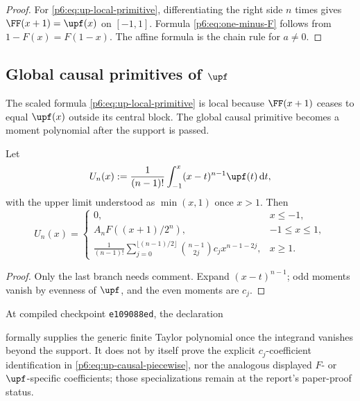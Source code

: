 \documentclass[11pt,oneside]{article}
\theoremstyle{definition}
\theoremstyle{remark}
\newcommand{\dd}{\,\mathrm d}
\newcommand{\1}{\mathbf 1}
\begin{document}
\begin{proof}
For \eqref{p6:eq:up-local-primitive}, differentiating the right side \(n\) times gives
\(\FF(x+1)=\upf(x)\) on \([-1,1]\).  Formula \eqref{p6:eq:one-minus-F} follows from
\(1-F(x)=F(1-x)\).  The affine formula is the chain rule for \(a\ne0\).
\end{proof}

\subsection{Global causal primitives of \(\upf\)}

The scaled formula \eqref{p6:eq:up-local-primitive} is local because \(\FF(x+1)\) ceases
to equal \(\upf(x)\) outside its central block.  The global causal primitive becomes a
moment polynomial after the support is passed.

\begin{proposition}
\label{p6:prop:up-causal}
Let
\[
 U_n(x):=\frac1{(n-1)!}\int_{-1}^{x}(x-t)^{n-1}\upf(t)\dd t,
\]
with the upper limit understood as \(\min(x,1)\) once \(x>1\).  Then
\begin{equation}
 U_n(x)=
 \begin{cases}
  0,&x\le-1,\\[1mm]
  A_nF((x+1)/2^n),&-1\le x\le1,\\[1mm]
  \displaystyle
  \frac1{(n-1)!}
  \sum_{j=0}^{\lfloor(n-1)/2\rfloor}
    \binom{n-1}{2j}c_jx^{n-1-2j},&x\ge1.
 \end{cases}                                               \label{p6:eq:up-causal-piecewise}
\end{equation}
\end{proposition}

\begin{proof}
Only the last branch needs comment.  Expand \((x-t)^{n-1}\); odd moments vanish by
evenness of \(\upf\), and the even moments are \(c_j\).
\end{proof}

\begin{remark}
At compiled checkpoint \texttt{e109088ed}, the declaration
\begin{center}
\end{center}
formally supplies the generic finite Taylor polynomial once the integrand vanishes beyond
the support.  It does not by itself prove the explicit \(c_j\)-coefficient identification in
\eqref{p6:eq:up-causal-piecewise}, nor the analogous displayed \(F\)- or
\(\upf\)-specific coefficients; those specializations remain at the report's paper-proof
status.
\end{remark}
\end{document}

